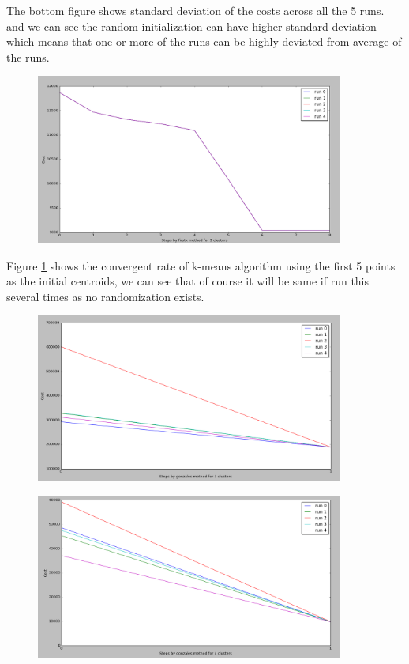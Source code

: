 The bottom figure shows standard deviation of the costs across all the 5 runs. and we can see the random initialization can have higher standard deviation which means that one or more of the runs can be highly deviated from average of the runs.

\begin{figure}[!htb]
\centering
\includegraphics[width=0.9\textwidth]{shots/firstk5clusters.png}
\caption{ }
\label{firstk5clusters}
\end{figure}

Figure \ref{firstk5clusters} shows the convergent rate of k-means algorithm using the first 5 points as the initial centroids, we can see that of course it will be same if run this several times as no randomization exists.


\begin{figure}[!htb]
\centering
\includegraphics[width=0.9\textwidth]{shots/gonzales3clusters.png}
\caption{ }
\label{gonzales3clusters}
\end{figure}

\begin{figure}[!htb]
\centering
\includegraphics[width=0.9\textwidth]{shots/gonzales4clusters.png}
\caption{ }
\label{gonzales4clusters}
\end{figure}

